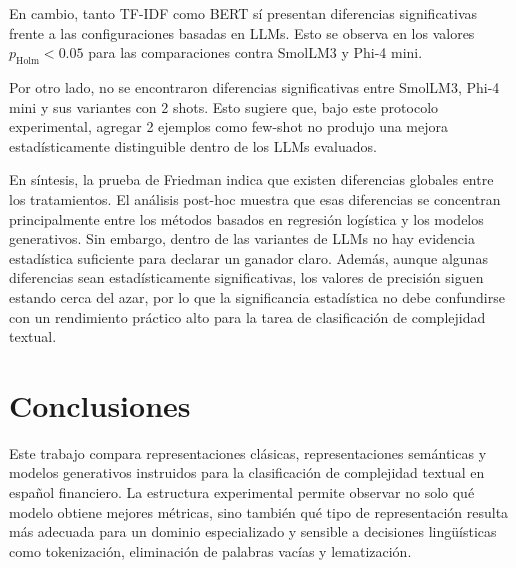 \documentclass[12pt]{article}
\begin{document}
En cambio, tanto TF-IDF como BERT sí presentan diferencias significativas frente a las
configuraciones basadas en LLMs. Esto se observa en los valores $p_{\text{Holm}} < 0.05$ para las
comparaciones contra SmolLM3 y Phi-4 mini.

Por otro lado, no se encontraron diferencias significativas entre SmolLM3, Phi-4 mini y sus
variantes con 2 shots. Esto sugiere que, bajo este protocolo experimental, agregar 2 ejemplos
como few-shot no produjo una mejora estadísticamente distinguible dentro de los LLMs evaluados.

En síntesis, la prueba de Friedman indica que existen diferencias globales entre los
tratamientos. El análisis post-hoc muestra que esas diferencias se concentran principalmente
entre los métodos basados en regresión logística y los modelos generativos. Sin embargo, dentro
de las variantes de LLMs no hay evidencia estadística suficiente para declarar un ganador claro.
Además, aunque algunas diferencias sean estadísticamente significativas, los valores de precisión
siguen estando cerca del azar, por lo que la significancia estadística no debe confundirse con un
rendimiento práctico alto para la tarea de clasificación de complejidad textual.

\section{Conclusiones}

Este trabajo compara representaciones clásicas, representaciones semánticas y modelos generativos instruidos para la clasificación de complejidad textual en español financiero. La estructura experimental permite observar no solo qué modelo obtiene mejores métricas, sino también qué tipo de representación resulta más adecuada para un dominio especializado y sensible a decisiones lingüísticas como tokenización, eliminación de palabras vacías y lematización.
\end{document}
